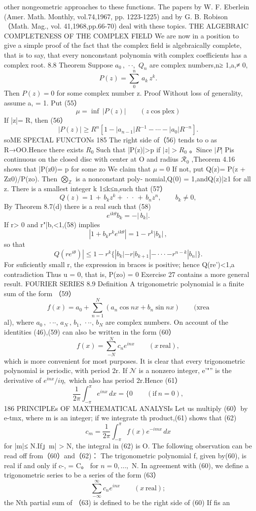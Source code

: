 other nongeometric approaches to these functions. The papers by W. F. Eberlein (Amer. Math. Monthly, vol.74,1967, pp. 1223-1225) and by G. B. Robison （Math. Mag., vol. 41,1968,pp.66-70) deal with these topics. THE ALGEBRAIC COMPLETENESS OF THE COMPLEX FIELD We are now in a position to give a simple proof of the fact that the complex field is algebraically complete, that is to say, that every nonconstant polynomia with complex coefficients has a complex root. 8.8 Theorem Suppose $a_{0}\,,\,\cdot\cdot,$ $Q_{n}$ are complex numbers,n≥ 1,a,≠ 0, $$ P(z)=\sum_{0}^{n}\,a_{k}\,z^{k}. $$ Then $P(z)=0$ for some complex number z. Proof Without loss of generality, assume a, = 1. Put (55） $$ \mu=\operatorname*{inf}\ |P(z)|\qquad(z\cos\mathrm{plex}) $$ If |z|= R, then (56） $$ |P(z)|\geq R^{n}[1-|a_{n-1}|R^{-1}-\cdots-|a_{0}|R^{-n}]. $$soME SPECIAL FUNCTONs 185 The right side of（56) tends to o as R→OO.Hence there exists $\textstyle R_{0}$ Such that |P(z)|>p if $|z|>R_{0}$ 。Since $|P|$ Pis continuous on the closed disc with center at O and radius $\textstyle{\mathcal{R}}_{0}$ ,Theorem 4.16 shows that |P(z0)= p for some zo We claim that $\scriptstyle\mu=0$ If not, put Q(z)= P(z + Zz0)/P(zo). Then $\bigotimes_{\mathbb{Z}}$ is a nonconstant poly- nomial,Q(0) = 1,andQ(z)|≥1 for all z. There is a smallest integer k 1≤k≤n,such that (57） $$ Q(z)=1\,+\,b_{k}z^{k}+\,\cdot\,\cdot\,+\,b_{n}z^{n},\qquad b_{k}\ne0, $$ By Theorem 8.7(d) there is a real such that (58) $$ e^{i k\theta}b_{k}=-\left|\,b_{k}\right|. $$ If r> 0 and r"|b,<1,(58) implies $$ |1+b_{k}r^{k}e^{i k\theta}|=1-r^{k}|b_{k}|\,, $$ so that $$ Q(r e^{i\theta})|\leq1-r^{k}\{|b_{k}|-r|b_{k+1}|-\cdot\cdot\cdot-r^{n-k}|b_{n}|\}. $$ For suficiently small r, the expression in braces is positive; hence Q(re')<1,a contradiction Thus u = 0, that is, P(zo) = 0 Exercise 27 contains a more general result. FOURIER SERIES 8.9 Definition A trigonometric polynomial is a finite sum of the form （59） $$ f(x)=a_{0}+\sum_{n=1}^{N}\left(a_{n}\cos n x+b_{n}\sin n x\right)\qquad{\mathrm{(xrea}} $$ al), where $a_{0}\,,\,\cdot\cdot\cdot,\,a_{N}\,,\,b_{1},\,\cdot\cdot\cdot,\,b_{N}$ are complex numbers. On account of the identities (46),(59) can also be written in the form (60） $$ f(x)=\sum_{-N}^{N}c_{n}e^{i n x}\qquad(x\,\mathrm{real}), $$ which is more convenient for most purposes. It is clear that every trigonometric polynomial is periodic, with period 2r. If ${\mathcal{N}}$ is a nonzero integer, e'"” is the derivative of ${e}^{i n x}/i\eta,$ which also has period 2r.Hence (61） $$ {\frac{1}{2\pi}}\int_{-\pi}^{\pi}e^{i n x}\,d x= \{0\qquad({\mathrm{if~}}n=0), $$186 PRINCIPLEs OF MAXTHEMATICAL ANALYSIs Let us multiply (60）by e-tmx, where m is an integer; if we integrate th product,(61) shows that (62) $$ c_{m}={\frac{1}{2\pi}}\int_{-\pi}^{\pi}f(x)e^{-i m x}\,d x $$ for |m|≤ N.If」m| > N, the integral in (62) is O. The following observation can be read off from（60）and（62)： The trigonometric polynomial f, given by(60), is real if and only if c-, = C。 for $n=0,\ldots,$ N. In agreement with (60), we define a trigonometric series to be a series of the form (63） $$ \sum_{-\infty}^{\infty}c_{n}e^{i n x}\qquad(x\ \mathrm{real}); $$ the Nth partial sum of （63) is defined to be the right side of (60) If fis an 